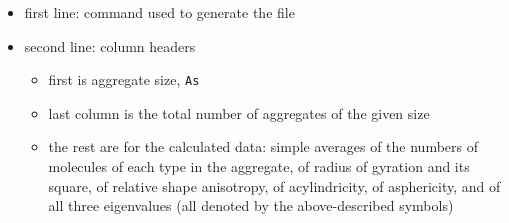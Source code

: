 \begin{enumerate}[nosep,leftmargin=20pt]
\begin{itemize}[nosep,leftmargin=5pt]
    \item first line: command used to generate the file
    \item second line: column headers
      \begin{itemize}[nosep,leftmargin=10pt]
        \item first is aggregate size, \texttt{As}
        \item last column is the total number of aggregates of the given size
        \item the rest are for the calculated data: simple averages of
          the numbers of molecules of each type in the aggregate, of radius
          of gyration and its square, of relative shape anisotropy,
          of acylindricity, of asphericity, and of all three eigenvalues
          (all denoted by the above-described symbols)
      \end{itemize}
  \end{itemize}
\end{enumerate}
